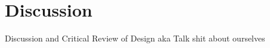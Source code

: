 \documentclass[../main.tex]{subfiles}
\begin{document}
\chapter{Discussion}

Discussion and Critical Review of Design aka Talk shit about ourselves
\end{document}
